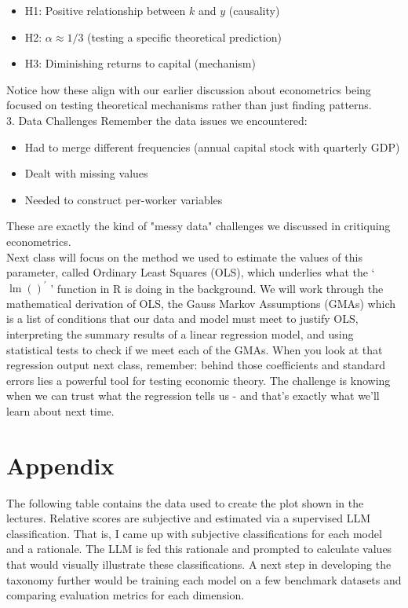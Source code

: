 \documentclass[10pt]{article}
\begin{document}
\begin{itemize}
  \item H1: Positive relationship between $k$ and $y$ (causality)
  \item H2: $\alpha \approx 1 / 3$ (testing a specific theoretical prediction)
  \item H3: Diminishing returns to capital (mechanism)
\end{itemize}

Notice how these align with our earlier discussion about econometrics being focused on testing theoretical mechanisms rather than just finding patterns.\\
3. Data Challenges Remember the data issues we encountered:

\begin{itemize}
  \item Had to merge different frequencies (annual capital stock with quarterly GDP)
  \item Dealt with missing values
  \item Needed to construct per-worker variables
\end{itemize}

These are exactly the kind of "messy data" challenges we discussed in critiquing econometrics.\\
Next class will focus on the method we used to estimate the values of this parameter, called Ordinary Least Squares (OLS), which underlies what the ` $\operatorname{lm}()^{\prime}$ ' function in R is doing in the background. We will work through the mathematical derivation of OLS, the Gauss Markov Assumptions (GMAs) which is a list of conditions that our data and model must meet to justify OLS, interpreting the summary results of a linear regression model, and using statistical tests to check if we meet each of the GMAs. When you look at that regression output next class, remember: behind those coefficients and standard errors lies a powerful tool for testing economic theory. The challenge is knowing when we can trust what the regression tells us - and that's exactly what we'll learn about next time.

\section*{Appendix}
The following table contains the data used to create the plot shown in the lectures. Relative scores are subjective and estimated via a supervised LLM classification. That is, I came up with subjective classifications for each model and a rationale. The LLM is fed this rationale and prompted to calculate values that would visually illustrate these classifications. A next step in developing the taxonomy further would be training each model on a few benchmark datasets and comparing evaluation metrics for each dimension.
\end{document}
